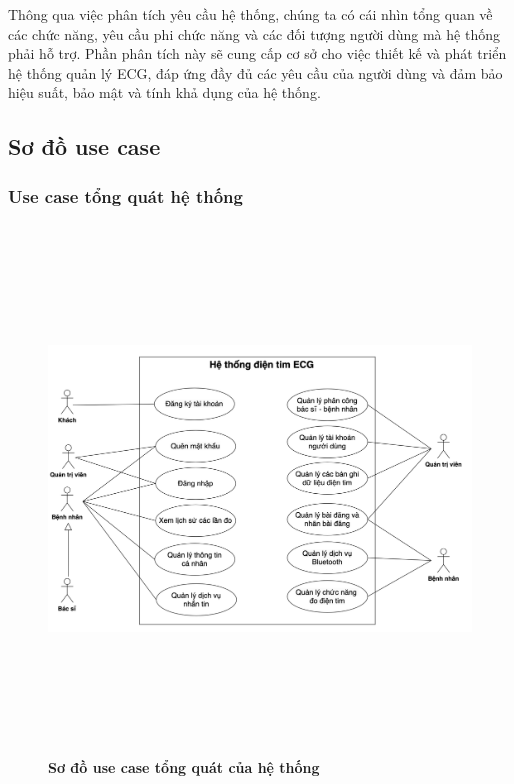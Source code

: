 \documentclass{article}%
\begin{document}
Thông qua việc phân tích yêu cầu hệ thống, chúng ta có cái nhìn tổng quan về các chức năng, yêu cầu phi chức năng và 
các đối tượng người dùng mà hệ thống phải hỗ trợ. Phần phân tích này sẽ cung cấp cơ sở cho việc thiết kế và phát triển hệ thống quản lý ECG, 
đáp ứng đầy đủ các yêu cầu của người dùng và đảm bảo hiệu suất, bảo mật và tính khả dụng của hệ thống.
\subsection{Sơ đồ use case}
\subsubsection{Use case tổng quát hệ thống}
  \begin{figure}[H]
    \centering
    \includegraphics[width=17cm,height=14cm]{Images/use_case/use_case_general.png}
    \caption[Sơ đồ use case tổng quát của hệ thống]{\bfseries \fontsize{12pt}{0pt}
    \selectfont Sơ đồ use case tổng quát của hệ thống}
    \label{hinh21} %
  \end{figure}
\end{document}
